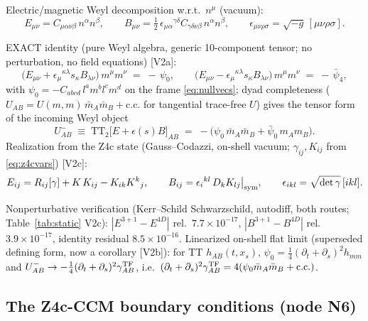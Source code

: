 Electric/magnetic Weyl decomposition w.r.t.\ $n^\mu$ (vacuum):
\begin{equation}
E_{\mu\nu} = C_{\mu\alpha\nu\beta}\,n^\alpha n^\beta,
\qquad
B_{\mu\nu} = \tfrac12\,\epsilon_{\mu\alpha}{}^{\gamma\delta}
             C_{\gamma\delta\nu\beta}\,n^\alpha n^\beta,
\qquad
\epsilon_{\mu\nu\rho\sigma}=\sqrt{-g}\,[\mu\nu\rho\sigma].
\label{eq:ebdef}
\end{equation}
\begin{nfblock}
EXACT identity (pure Weyl algebra, generic 10-component tensor; no
perturbation, no field equations) [V2a]:
\begin{equation}
\big(E_{\mu\nu} + \epsilon_{\mu}{}^{\kappa\lambda}s_\kappa
 B_{\lambda\nu}\big)\,m^\mu m^\nu \;=\; -\,\psi_0,
\qquad
\big(E_{\mu\nu} - \epsilon_{\mu}{}^{\kappa\lambda}s_\kappa
 B_{\lambda\nu}\big)\,m^\mu m^\nu \;=\; -\,\bar\psi_4,
\label{eq:exact-dictionary}
\end{equation}
with $\psi_0 = -C_{abcd}\,l^a m^b l^c m^d$ on the frame \eqref{eq:nullvecs};
dyad completeness ($U_{AB} = U(m,m)\,\bar m_A \bar m_B + \mathrm{c.c.}$ for
tangential trace-free $U$) gives the tensor form of the incoming Weyl object
\begin{equation}
U^-_{AB} \;\equiv\; \mathrm{TT}_2\big[E + \epsilon(s)B\big]_{AB}
 \;=\; -\big(\psi_0\,\bar m_A \bar m_B + \bar\psi_0\, m_A m_B\big).
\label{eq:uminus}
\end{equation}
Realization from the Z4c state (Gauss--Codazzi, on-shell vacuum;
$\gamma_{ij}, K_{ij}$ from \eqref{eq:z4cvars}) [V2c]:
\begin{equation}
E_{ij} = R_{ij}[\gamma] + K\,K_{ij} - K_{ik}K^k{}_j,
\qquad
B_{ij} = \epsilon_i{}^{kl}\,D_k K_{lj}\big|_{\rm sym},
\qquad
\epsilon_{ikl} = \sqrt{\det\gamma}\,[ikl].
\label{eq:gausscodazzi}
\end{equation}
\end{nfblock}
Nonperturbative verification (Kerr--Schild Schwarzschild, autodiff, both
routes; Table~\ref{tab:static} V2c): $|E^{3+1}{-}E^{4D}|$ rel.\
$7.7{\times}10^{-17}$, $|B^{3+1}{-}B^{4D}|$ rel.\ $3.9{\times}10^{-17}$,
identity residual $8.5{\times}10^{-16}$. Linearized on-shell flat limit
(superseded defining form, now a corollary [V2b]): for TT $h_{AB}(t,x_s)$,
$\psi_0 = \tfrac14(\partial_t+\partial_s)^2 h_{mm}$ and
$U^-_{AB}\to -\tfrac14 (\partial_t + \partial_s)^2 \gamma^{\rm TF}_{AB}$,
i.e.\ $(\partial_t+\partial_s)^2\gamma^{\rm TF}_{AB}
 = 4(\psi_0 \bar m_A\bar m_B + \mathrm{c.c.})$.

\subsection{The Z4c-CCM boundary conditions (node N6)}
\label{sec:bcrows}
\label{sec:n6}

